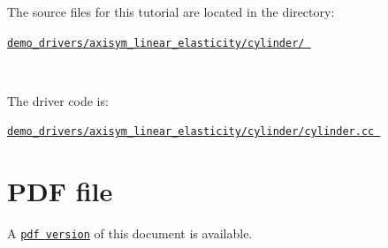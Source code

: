 \begin{DoxyItemize}
\item The source files for this tutorial are located in the directory\+:~\newline
~\newline
\begin{center} \href{../../../../demo_drivers/axisym_linear_elasticity/cylinder/}{\tt demo\+\_\+drivers/axisym\+\_\+linear\+\_\+elasticity/cylinder/ } \end{center} ~\newline

\item The driver code is\+: ~\newline
~\newline
\begin{center} \href{../../../../demo_drivers/axisym_linear_elasticity/cylinder/cylinder.cc}{\tt demo\+\_\+drivers/axisym\+\_\+linear\+\_\+elasticity/cylinder/cylinder.\+cc } \end{center} 
\end{DoxyItemize}



 

 \hypertarget{index_pdf}{}\section{P\+D\+F file}\label{index_pdf}
A \href{../latex/refman.pdf}{\tt pdf version} of this document is available. 
